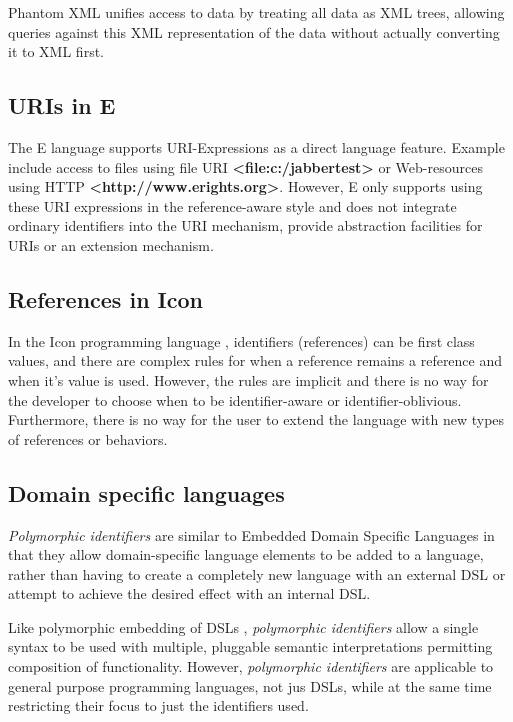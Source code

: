 \documentclass[preprint,authoryear]{acm_proc_article-sp}
\begin{document}
Phantom XML\cite{phantomxml} unifies access to data by treating all data as
XML trees, allowing queries against this XML representation of the data without
actually converting it to XML first.  




\subsection{URIs in E}

The E language\cite{MillerRobustComposition}  supports URI-Expressions as a
direct language feature.  Example include access to files
using file URI  {\bf <file:c:/jabbertest>} or Web-resources using HTTP {\bf <http://www.erights.org>}.  However,
E only supports using these URI expressions in the reference-aware style and does not integrate 
ordinary identifiers into the URI mechanism, provide abstraction facilities 
for URIs or an extension mechanism. 


\subsection{References in Icon}

In the Icon programming language \cite{IconRef} , identifiers (references) can be first class values,
and there are complex rules for when a reference remains a reference and when
it's value is used.  However, the rules are implicit and there is no way for the 
developer to choose when to be identifier-aware or identifier-oblivious.  Furthermore,
there is no way for the user to extend the language with new types of references 
or behaviors.



\subsection{Domain specific languages}

\emph{Polymorphic identifiers} are similar to Embedded Domain Specific Languages\cite{edsl}
in that they allow domain-specific language elements to be added to a language, rather
than having to create a completely new language with an external DSL or attempt to 
achieve the desired effect with an internal DSL\cite{fowlerdsl}.  

Like polymorphic embedding of DSLs \cite{polydsl}, \emph{polymorphic identifiers} allow
a single syntax to be used with multiple, pluggable semantic interpretations permitting
composition of functionality\cite{embeddeddsl}.  However, \emph{polymorphic identifiers}
are applicable to general purpose programming languages, not jus DSLs, while
at the same time restricting their focus to just the identifiers used.
\end{document}
